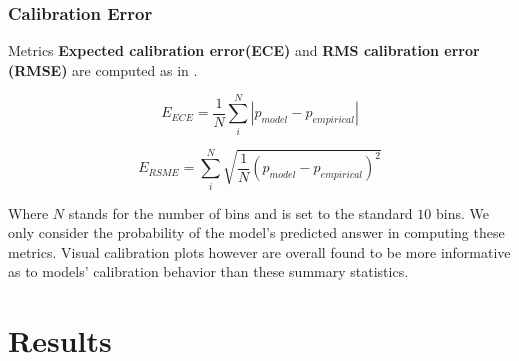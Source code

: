 \documentclass[11pt]{article}
\begin{document}
\subsubsection{Calibration Error}

Metrics \textbf{Expected calibration error(ECE)} and \textbf{RMS calibration error (RMSE)} are computed as in \cite{kadavath2022language}. 

\begin{equation}
    E_{ECE} = \frac{1}{N}  \sum_{i}^N | p_{model} - p_{empirical}|
\end{equation}

\begin{equation}
    E_{RSME} = \sum_{i}^N \sqrt{\frac{1}{N} (p_{model} - p_{empirical})^2}
\end{equation}

Where $N$ stands for the number of bins and is set to the standard $10$ bins. We only consider the probability of the model's predicted 
answer in computing these metrics. Visual calibration plots however 
are overall found to be more informative as to models' calibration
behavior than these summary statistics.

\section{Results}

\end{document}
